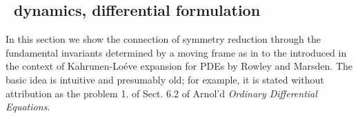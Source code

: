 

\renewcommand{\Group}{\ensuremath{G}}         %

\subsection{\Slice\ dynamics, differential formulation}
\label{sec:MovFrameODE}



In this section we show the connection of symmetry reduction through the
fundamental invariants determined  by a moving frame as in 
to the \emph{\mframes} introduced in the context of Kahrunen-Lo\'eve
expansion for PDEs by Rowley and Marsden.
The basic idea is intuitive and presumably old; for example, it is stated
without attribution as the problem 1. of Sect. 6.2 of Arnol'd
{\em Ordinary Differential Equations}. 




